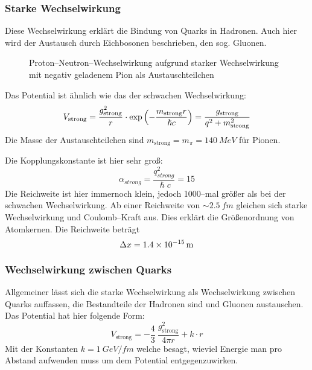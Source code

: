 \documentclass[Ex4_Zusammenfassung.tex]{subfiles}
\begin{document}
\subsubsection{Starke Wechselwirkung}
Diese Wechselwirkung erklärt die Bindung von Quarks in Hadronen. Auch hier wird der Austausch durch Eichbosonen beschrieben, den sog. Gluonen. 
\begin{figure}[H]
	\centering
	\caption{Proton--Neutron--Wechselwirkung aufgrund starker Wechselwirkung mit negativ geladenem Pion als Austauschteilchen}
\end{figure}
Das Potential ist ähnlich wie das der schwachen Wechselwirkung:
\begin{equation}
	V_{\text{strong}} = \frac{g_{\text{strong}}^2}{r} \cdot \exp\left( -\frac{m_{\text{strong}} r}{\hslash c}\right) = \frac{g_{\text{strong}}}{q^2 + m_{\text{strong}}^2}
\end{equation}
Die Masse der Austauschteilchen sind  $ m_{\text{strong}} = m_{\pi} = \SI{140}{MeV}$ für Pionen. 

Die Kopplungskonstante ist hier sehr groß:
\begin{equation}
	\alpha_{strong} = \frac{q_{strong}^2}{\hslash c} = 15 
\end{equation}
Die Reichweite ist hier immernoch klein, jedoch 1000--mal größer als bei der schwachen Wechselwirkung. Ab einer Reichweite von $ \sim \SI{2.5}{fm}$ gleichen sich starke Wechselwirkung und Coulomb--Kraft aus. Dies erklärt die Größenordnung von Atomkernen. Die Reichweite beträgt 
\begin{equation}
	\Delta x = \SI{1.4E-15}{m}
\end{equation}

\subsubsection{Wechselwirkung zwischen Quarks}
Allgemeiner lässt sich die starke Wechselwirkung als Wechselwirkung zwischen Quarks auffassen, die Bestandteile der Hadronen sind und Gluonen austauschen. Das Potential hat hier folgende Form: 
\begin{equation}
	V_{\text{strong}} = - \frac{4}{3} \  \frac{g_{\text{strong}}^2}{4 \pi r} + k \cdot r 
\end{equation}
Mit der Konstanten $ k = \SI{1}{GeV/fm} $ welche besagt, wieviel Energie man pro Abstand aufwenden muss um dem Potential entgegenzuwirken. 
\end{document}
